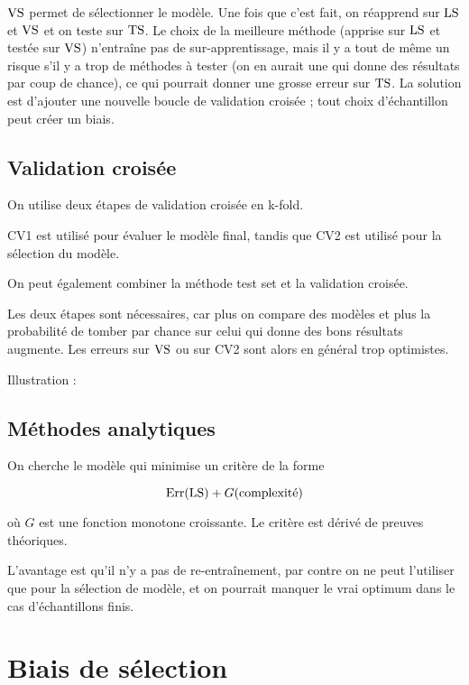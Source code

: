 	$\text{VS}$ permet de sélectionner le modèle. Une fois que c'est fait, on réapprend sur $\text{LS}$ et $\text{VS}$ et on teste sur $\text{TS}$. Le choix de la meilleure méthode (apprise sur $\text{LS}$ et testée sur $\text{VS}$) n'entraîne pas de sur-apprentissage, mais il y a tout de même un risque s'il y a trop de méthodes à tester (on en aurait une qui donne des résultats par coup de chance), ce qui pourrait donner une grosse erreur sur $\text{TS}$. La solution est d'ajouter une nouvelle boucle de validation croisée ; tout choix d'échantillon peut créer un biais.
	
	\subsection{Validation croisée}
	
	On utilise deux étapes de validation croisée en k-fold.
	
	
	CV1 est utilisé pour évaluer le modèle final, tandis que CV2 est utilisé pour la sélection du modèle.
	
	On peut également combiner la méthode test set et la validation croisée.
	
	
	Les deux étapes sont nécessaires, car plus on compare des modèles et plus la probabilité de tomber par chance sur celui qui donne des bons résultats augmente. Les erreurs sur $\text{VS}$ ou sur CV2 sont alors en général trop optimistes.
	
	Illustration :
	
	
	\subsection{Méthodes analytiques}
	
	On cherche le modèle qui minimise un critère de la forme
	
	$$\text{Err}(\text{LS}) + G(\text{complexité})$$
	
	où $G$ est une fonction monotone croissante. Le critère est dérivé de preuves théoriques.
	
	L'avantage est qu'il n'y a pas de re-entraînement, par contre on ne peut l'utiliser que pour la sélection de modèle, et on pourrait manquer le vrai optimum dans le cas d'échantillons finis.
	
\section{Biais de sélection}
	
